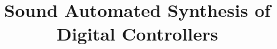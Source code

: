 \documentclass{sig-alternate-05-2015}
\begin{document}

\doi{}

\isbn{}

%

\title{
Sound Automated Synthesis of Digital Controllers
}
%
%
%
%
%
\end{document}

